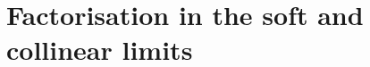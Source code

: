 \section{Factorisation in the soft and collinear limits}\label{sec:qcd_soft_fact}
\begin{figure}
\begin{center}
   \hfill
   \hfill

\end{center}
\end{figure}
